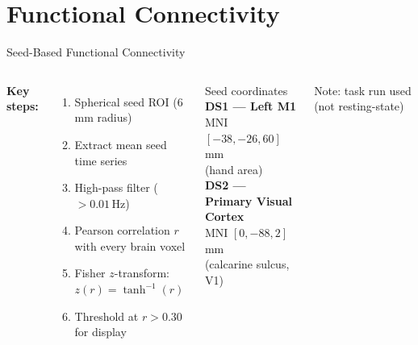 \documentclass[aspectratio=169]{beamer}
\begin{document}
\section{Functional Connectivity}

\begin{frame}{Seed-Based Functional Connectivity}
  \begin{columns}
      \textbf{Key steps:}
      \begin{enumerate}
        \item Spherical seed ROI (6\,mm radius)
        \item Extract mean seed time series
        \item High-pass filter ($>0.01$\,Hz)
        \item Pearson correlation $r$ with every brain voxel
        \item Fisher $z$-transform: $z(r) = \tanh^{-1}(r)$
        \item Threshold at $r > 0.30$ for display
      \end{enumerate}
      \begin{block}{Seed coordinates}
        \textbf{DS1 --- Left M1}\\
        MNI $[-38, -26, 60]$\,mm\\
        (hand area)\\[0.5em]
        \textbf{DS2 --- Primary Visual Cortex}\\
        MNI $[0, -88, 2]$\,mm\\
        (calcarine sulcus, V1)
      \end{block}
      \vspace{0.3em}
      \small Note: task run used (not resting-state)
  \end{columns}
\end{frame}
\end{document}
